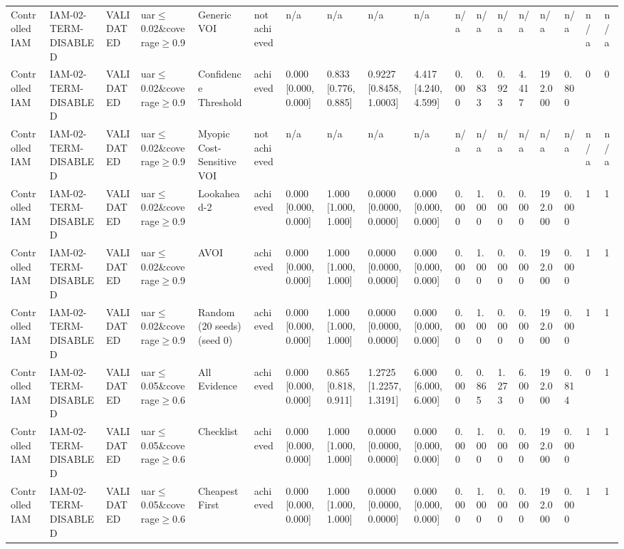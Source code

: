 \begin{table}[!ht]
{\begin{tabular}{llllllllllllllllll}
Controlled IAM & IAM-02-TERM-DISABLED & VALIDATED & uar$\le$0.02\&coverage$\ge$0.9 & Generic VOI & not achieved & n/a & n/a & n/a & n/a & n/a & n/a & n/a & n/a & n/a & n/a & n/a & n/a \\
Controlled IAM & IAM-02-TERM-DISABLED & VALIDATED & uar$\le$0.02\&coverage$\ge$0.9 & Confidence Threshold & achieved & 0.000 [0.000, 0.000] & 0.833 [0.776, 0.885] & 0.9227 [0.8458, 1.0003] & 4.417 [4.240, 4.599] & 0.000 & 0.833 & 0.923 & 4.417 & 192.000 & 0.800 & 0 & 0 \\
Controlled IAM & IAM-02-TERM-DISABLED & VALIDATED & uar$\le$0.02\&coverage$\ge$0.9 & Myopic Cost-Sensitive VOI & not achieved & n/a & n/a & n/a & n/a & n/a & n/a & n/a & n/a & n/a & n/a & n/a & n/a \\
Controlled IAM & IAM-02-TERM-DISABLED & VALIDATED & uar$\le$0.02\&coverage$\ge$0.9 & Lookahead-2 & achieved & 0.000 [0.000, 0.000] & 1.000 [1.000, 1.000] & 0.0000 [0.0000, 0.0000] & 0.000 [0.000, 0.000] & 0.000 & 1.000 & 0.000 & 0.000 & 192.000 & 0.000 & 1 & 1 \\
Controlled IAM & IAM-02-TERM-DISABLED & VALIDATED & uar$\le$0.02\&coverage$\ge$0.9 & AVOI & achieved & 0.000 [0.000, 0.000] & 1.000 [1.000, 1.000] & 0.0000 [0.0000, 0.0000] & 0.000 [0.000, 0.000] & 0.000 & 1.000 & 0.000 & 0.000 & 192.000 & 0.000 & 1 & 1 \\
Controlled IAM & IAM-02-TERM-DISABLED & VALIDATED & uar$\le$0.02\&coverage$\ge$0.9 & Random (20 seeds) (seed 0) & achieved & 0.000 [0.000, 0.000] & 1.000 [1.000, 1.000] & 0.0000 [0.0000, 0.0000] & 0.000 [0.000, 0.000] & 0.000 & 1.000 & 0.000 & 0.000 & 192.000 & 0.000 & 1 & 1 \\
Controlled IAM & IAM-02-TERM-DISABLED & VALIDATED & uar$\le$0.05\&coverage$\ge$0.6 & All Evidence & achieved & 0.000 [0.000, 0.000] & 0.865 [0.818, 0.911] & 1.2725 [1.2257, 1.3191] & 6.000 [6.000, 6.000] & 0.000 & 0.865 & 1.273 & 6.000 & 192.000 & 0.814 & 0 & 1 \\
Controlled IAM & IAM-02-TERM-DISABLED & VALIDATED & uar$\le$0.05\&coverage$\ge$0.6 & Checklist & achieved & 0.000 [0.000, 0.000] & 1.000 [1.000, 1.000] & 0.0000 [0.0000, 0.0000] & 0.000 [0.000, 0.000] & 0.000 & 1.000 & 0.000 & 0.000 & 192.000 & 0.000 & 1 & 1 \\
Controlled IAM & IAM-02-TERM-DISABLED & VALIDATED & uar$\le$0.05\&coverage$\ge$0.6 & Cheapest First & achieved & 0.000 [0.000, 0.000] & 1.000 [1.000, 1.000] & 0.0000 [0.0000, 0.0000] & 0.000 [0.000, 0.000] & 0.000 & 1.000 & 0.000 & 0.000 & 192.000 & 0.000 & 1 & 1 \\

\end{tabular}}
\end{table}
